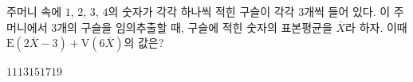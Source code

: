 주머니 속에 $1$, $2$, $3$, $4$의 숫자가 각각 하나씩 적힌 구슬이 각각 $3$개씩 들어 있다. 이 주머니에서 $3$개의 구슬을 임의추출할 때, 구슬에 적힌 숫자의 표본평균을 $\overline{X}$라 하자. 이때 $\mathrm{E}(2\overline{X}-3)+\mathrm{V}(6\overline{X})$의 값은?
\begin{choices32}{$11$}{$13$}{$15$}{$17$}{$19$}\end{choices32}
